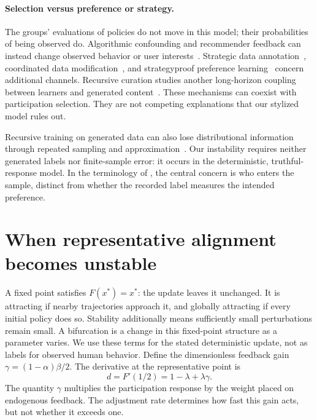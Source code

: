 \documentclass{article}
\begin{document}
\paragraph{Selection versus preference or strategy.}
The groups' evaluations of policies do not move in this model; their probabilities of being observed do. Algorithmic confounding and recommender feedback can instead change observed behavior or user interests~\citep{chaney2018,jiang2019}. Strategic data annotation~\citep{xie2024}, coordinated data modification~\citep{hardt2023}, and strategyproof preference learning~\citep{kleine2025,sun2025} concern additional channels. Recursive curation studies another long-horizon coupling between learners and generated content~\citep{falahati2026}. These mechanisms can coexist with participation selection. They are not competing explanations that our stylized model rules out.

Recursive training on generated data can also lose distributional information through repeated sampling and approximation~\citep{shumailov2024}. Our instability requires neither generated labels nor finite-sample error: it occurs in the deterministic, truthful-response model. In the terminology of \citet{suresh2021}, the central concern is who enters the sample, distinct from whether the recorded label measures the intended preference.

\section{When representative alignment becomes unstable}\label{sec:threshold}
A fixed point satisfies $F(x^*)=x^*$: the update leaves it unchanged. It is attracting if nearby trajectories approach it, and globally attracting if every initial policy does so. Stability additionally means sufficiently small perturbations remain small. A bifurcation is a change in this fixed-point structure as a parameter varies. We use these terms for the stated deterministic update, not as labels for observed human behavior.
Define the dimensionless feedback gain $\gamma=(1-\alpha)\beta/2$. The derivative at the representative point is
\begin{equation}
d=F'(1/2)=1-\lambda+\lambda\gamma.
\label{eq:gain}
\end{equation}
The quantity $\gamma$ multiplies the participation response by the weight placed on endogenous feedback. The adjustment rate determines how fast this gain acts, but not whether it exceeds one.
\end{document}
